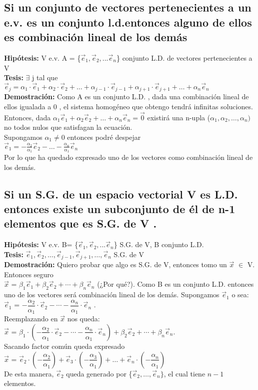 \documentclass[11pt]{article}
\begin{document}
\subsection{Si un conjunto de vectores pertenecientes a un e.v. es un conjunto l.d.entonces alguno de ellos es combinación lineal de los demás }
{\bfseries {Hipótesis:}} V e.v. A = \{$\vec{e}_{1}, \vec{e}_2,... \vec{e}_n $\} conjunto L.D. de vectores pertenecientes a V \\
{\bfseries {Tesis:}} $\exists$ j tal que $\vec{e}_j = \alpha_1\cdot\vec{e}_1 + \alpha_2\cdot\vec{e}_2 + \hdots + \alpha_{j-1}\cdot\vec{e}_{j-1} + \alpha_{j+1}\cdot\vec{e}_{j+1} + \hdots + \alpha_n\vec{e}_n$\\
{\bfseries Demostración:} Como A es un conjunto L.D. , dada una combinación lineal de ellos igualada a 0  , el sistema homogéneo que obtengo tendrá infinitas soluciones. \\
Entonces, dada $\alpha_1\vec{e}_1+\alpha_2\vec{e}_2+\hdots+\alpha_n\vec{e}_{n} = \vec{0}$ existirá una n-upla ($\alpha_1,\alpha_2,\hdots,\alpha_n)$ no todos nulos que satisfagan la ecuación.\\
Supongamos $\alpha_1 \neq 0$ entonces podré despejar \\
$\vec{e}_1 = -\frac{\alpha_2}{\alpha_1} \vec{e}_2 - \hdots - \frac{\alpha_n}{\alpha_1}\vec{e}_n$\\
Por lo que ha quedado expresado uno de los vectores como combinación lineal de los demás. 
\subsection{Si un S.G. de un espacio vectorial V es L.D. entonces existe un subconjunto de él de n-1 elementos que es S.G. de V .}
{\bfseries {Hipótesis:}} V e.v. B= \{$\vec{e}_{1}, \vec{e}_2,... \vec{e}_n $\} S.G. de V, B conjunto L.D. \\
{\bfseries {Tesis:}} $\vec{e}_1 , \vec{e}_2 , \hdots , \vec{e}_{j-1} , \vec{e}_{j+1} , \hdots , \vec{e}_n$ S.G. de V\\
{\bfseries Demostración:} Quiero probar que algo es S.G. de V, entonces tomo un $\vec{x}$ $\in$ V. Entonces seguro\\ $\vec{x}$ = $\beta_1\vec{e}_1+\beta_2\vec{e}_2+\cdots+\beta_n\vec{e}_n$ (¿Por qué?). Como B es un conjunto L.D. entonces uno de los vectores será combinación lineal de los demás. Supongamos $\vec{e}_1$ o sea: \\
$\vec{e}_1$ = $-\dfrac{\alpha_2}{\alpha_1}\cdot\vec{e}_2 - \cdots - \dfrac{\alpha_n}{\alpha_1}\cdot\vec{e}_n$ . \\
Reemplazando en $\vec{x}$ nos queda: \\
$\vec{x}$ = $\beta_1 \cdot (-\dfrac{\alpha_2}{\alpha_1}\cdot\vec{e}_2 - \cdots - \dfrac{\alpha_n}{\alpha_1}\cdot\vec{e}_n)+\beta_2\vec{e}_2+\cdots+\beta_n\vec{e}_n $. \\
Sacando factor común queda expresado\\ $\vec{x}$ = $\vec{e}_2 \cdot (- \dfrac{\alpha_2}{\alpha_1}) + \vec{e}_3 \cdot (- \dfrac{\alpha_3}{\alpha_1}) + \hdots + \vec{e}_n \cdot (-\dfrac{\alpha_n}{\alpha_1})$  \\
De esta manera, $\vec{e}_2$ queda generado por \{$\vec{e}_2,\hdots,\vec{e}_n\}$, el cual tiene $n-1$ elementos. 
\end{document}
